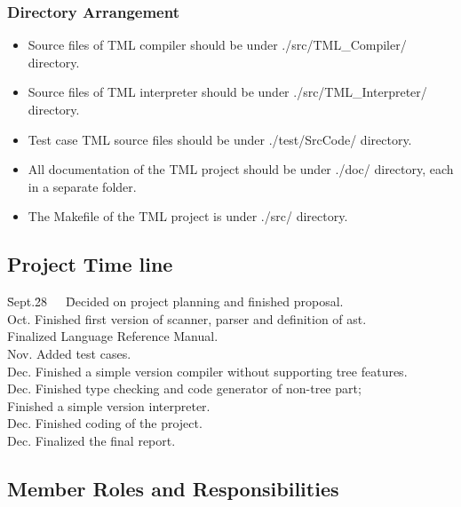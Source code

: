 \documentclass[12pt,psfig,a4]{article}
\begin{document}
\subsubsection{Directory Arrangement}
\begin{itemize}
\item Source files of TML compiler should be under ./src/TML\_Compiler/ directory.
\item Source files of TML interpreter should be under ./src/TML\_Interpreter/ directory.
\item Test case TML source files should be under ./test/SrcCode/ directory.
\item All documentation of the TML project should be under ./doc/ directory, each in a separate folder.
\item The Makefile of the TML project is under ./src/ directory.
\end{itemize}

\subsection{Project Time line}
\begin{code}
\begin{tabbing}
\=Sept.\=28~~~\=Decided on project planning and finished proposal.\\
\>Oct.  \>Finished first version of scanner, parser and definition of ast. \\
\> \> \>Finalized Language Reference Manual. \\
\>Nov.  \>Added test cases. \\
\>Dec.  \> Finished a simple version compiler without supporting tree features.\\
\>Dec.  \> Finished type checking and code generator of non-tree part;\\
\> \> \> Finished a simple version interpreter.\\
\>Dec.  \> Finished coding of the project.\\
\>Dec. \> Finalized the final report.\\
\end{tabbing}
\end{code}

\subsection{Member Roles and Responsibilities}
\end{document}
